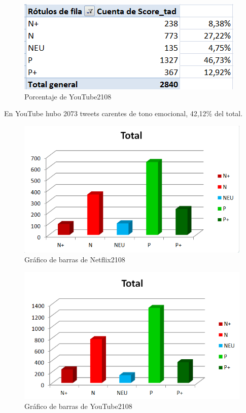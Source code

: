 \begin{figure}[H]
	\centering
	\includegraphics[scale=1]{imagenes/porcentajeYT2108.PNG}
	\caption{Porcentaje de YouTube2108}
	\label{fig:porcentaje-YT2108}
\end{figure}

En YouTube hubo 2073 tweets carentes de tono emocional, 42,12\% del total. 


\begin{figure}[H]
	\centering
	\includegraphics[scale=1]{imagenes/barrasNetflix2108.PNG}
	\caption{Gráfico de barras de Netflix2108}
	\label{fig:barrasNetflix2108}
\end{figure}



\begin{figure}[H]
	\centering
	\includegraphics[scale=1]{imagenes/barrasYT2108.PNG}
	\caption{Gráfico de barras de YouTube2108}
	\label{fig:barrasYT2108}
\end{figure}


